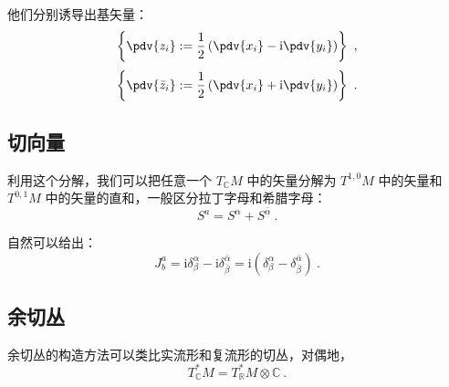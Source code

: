 他们分别诱导出基矢量：
\begin{equation}
\left\{ \pdv{z_i} := \frac{1}{2} \left( \pdv{x_i} - \mathrm i \pdv{y_i} \right) \right\} ~,
\end{equation}
\begin{equation} 
\left\{ \pdv{\bar z_i} := \frac{1}{2} \left( \pdv{x_i} + \mathrm i \pdv{y_i} \right)\right\} ~.
\end{equation}

\subsection{切向量}
利用这个分解，我们可以把任意一个 $T_\mathbb C M$ 中的矢量分解为 $T^{1, 0} M$ 中的矢量和 $T^{0, 1} M$ 中的矢量的直和，一般区分拉丁字母和希腊字母：
\begin{equation}
S^a = S^\alpha + S^{\bar \alpha} ~.
\end{equation}

自然可以给出：
\begin{equation}
J^a_b = \mathrm i \delta^\alpha_\beta - \mathrm i \delta^{\bar \alpha}_{\bar \beta} = \mathrm i(\delta^\alpha_\beta - \delta^{\bar \alpha}_{\bar \beta} )~.
\end{equation}

\subsection{余切丛}
余切丛的构造方法可以类比实流形和复流形的切丛，对偶地，
\begin{equation}
T^*_\mathbb C M = T^*_\mathbb R M \otimes \mathbb C ~.
\end{equation}


